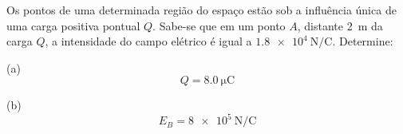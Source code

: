 

\question [\questaopt] Os pontos de uma determinada região do espaço estão sob a
influência única de uma carga positiva pontual $ Q $. Sabe-se que em um
ponto $ A $, distante \SI{2}{\meter} da carga $ Q $, a intensidade do campo elétrico é
igual a $\SI[per-mode = symbol-or-fraction]{1,8e4}{\newton\per\coulomb}$. Determine:




\begin{EnvUplevel}
	\begin{solution}[2cm]
	
		(a)\\
		$$
		Q=\SI{+8,0}{\micro \coulomb}
		$$
			
		(b)
		$$
		E_B=\SI[per-mode=symbol-or-fraction]{8e5}{\newton \per \coulomb}
		$$

		
	\end{solution}
\end{EnvUplevel}
